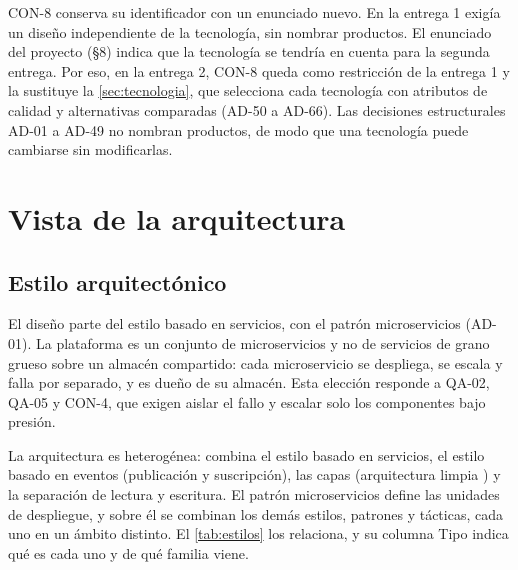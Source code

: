 \documentclass[11pt,letterpaper]{article}
\begin{document}
CON-8 conserva su identificador con un enunciado nuevo. En la entrega 1 exigía un diseño
independiente de la tecnología, sin nombrar productos. El enunciado del proyecto (§8) indica que la
tecnología se tendría en cuenta para la segunda entrega. Por eso, en la entrega 2, CON-8 queda como
restricción de la entrega 1 y la sustituye la \cref{sec:tecnologia}, que selecciona cada tecnología
con atributos de calidad y alternativas comparadas (AD-50 a AD-66). Las decisiones estructurales
AD-01 a AD-49 no nombran productos, de modo que una tecnología puede cambiarse sin modificarlas.

\section{Vista de la arquitectura}
\label{sec:vistas}

\subsection{Estilo arquitectónico}
\label{sec:estilo}

El diseño parte del estilo basado en servicios, con el patrón microservicios (AD-01). La plataforma
es un conjunto de microservicios y no de servicios de grano grueso sobre un almacén compartido: cada microservicio se
despliega, se escala y falla por separado, y es dueño de su almacén. Esta elección responde a QA-02,
QA-05 y CON-4, que exigen aislar el fallo y escalar solo los componentes bajo presión.

La arquitectura es heterogénea: combina el estilo basado en servicios, el estilo basado en eventos
(publicación y suscripción), las capas (arquitectura limpia \cite{martin}) y la separación de lectura
y escritura. El patrón microservicios define las unidades de despliegue, y sobre él se combinan los
demás estilos, patrones y tácticas, cada uno en un ámbito distinto. El \cref{tab:estilos} los
relaciona, y su columna Tipo indica qué es cada uno y de qué familia viene.
\end{document}
